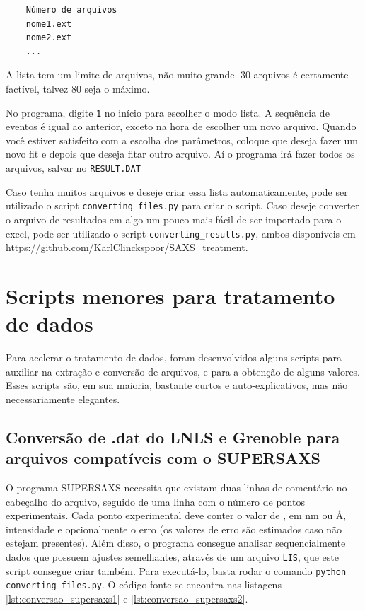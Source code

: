 \begin{apendicesenv}
\begin{linenumbers}
	\begin{verbatim}
	Número de arquivos
	nome1.ext
	nome2.ext
	...
	\end{verbatim}
\end{linenumbers}
\resetlinenumber[1]

A lista tem um limite de arquivos, não muito grande. 30 arquivos é certamente factível, talvez 80 seja o máximo.

No programa, digite \texttt{1} no início para escolher o modo lista. A sequência de eventos é igual ao anterior, exceto na hora de escolher um novo arquivo. Quando você estiver satisfeito com a escolha dos parâmetros, coloque que deseja fazer um novo fit e depois que deseja fitar outro arquivo. Aí o programa irá fazer todos os arquivos, salvar no \texttt{RESULT.DAT}

Caso tenha muitos arquivos e deseje criar essa lista automaticamente, pode ser utilizado o script \texttt{converting\_files.py} para criar o script. Caso deseje converter o arquivo de resultados em algo um pouco mais fácil de ser importado para o excel, pode ser utilizado o script \texttt{converting\_results.py}, ambos disponíveis em \\https://github.com/KarlClinckspoor/SAXS\_treatment.

\section{Scripts menores para tratamento de dados}

Para acelerar o tratamento de dados, foram desenvolvidos alguns scripts para auxiliar na extração e conversão de arquivos, e para a obtenção de alguns valores. Esses scripts são, em sua maioria, bastante curtos e auto-explicativos, mas não necessariamente elegantes.

\subsection{Conversão de .dat do LNLS e Grenoble para arquivos compatíveis com o SUPERSAXS}

O programa SUPERSAXS necessita que existam duas linhas de comentário no cabeçalho do arquivo, seguido de uma linha com o número de pontos experimentais. Cada ponto experimental deve conter o valor de \q, em nm ou Å, intensidade e opcionalmente o erro (os valores de erro são estimados caso não estejam presentes). Além disso, o programa consegue analisar sequencialmente dados que possuem ajustes semelhantes, através de um arquivo \texttt{LIS}, que este script consegue criar também. Para executá-lo, basta rodar o comando \texttt{python converting\_files.py}. O código fonte se encontra nas listagens \ref{lst:conversao_supersaxs1} e \ref{lst:conversao_supersaxs2}.


\end{apendicesenv}
